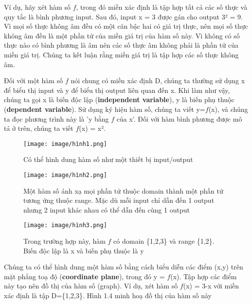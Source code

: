 \documentclass[a4paper,12pt,openany]{book}
\begin{document}
\vspace{13pt}
Ví dụ, hãy xét hàm số $f$, trong đó miền xác định là tập hợp tất cả các số thực và quy tắc là bình phương input. Sau đó, input x = 3 được gán cho output 3² = 9. Vì mọi số thực không âm đều có một căn bậc hai có giá trị thực, nên mọi số thực không âm đều là một phần tử của miền giá trị của hàm số này. Vì không có số thực nào có bình phương là âm nên các số thực âm không phải là phần tử của miền giá trị. Chúng ta kết luận rằng miền giá trị là tập hợp các số thực không âm.
\clearpage
\pagestyle{fancy} %
\fancyhf{} %
\fancyhead[L]{} %

Đối với một hàm số $f$ nói chung có miền xác định D, chúng ta thường sử dụng x để biểu thị input và y để biểu thị output liên quan đến x. Khi làm như vậy, chúng ta gọi x là biến độc lập (\textbf{independent variable}), y là biến phụ thuộc (\textbf{dependent variable}). Sử dụng ký hiệu hàm số, chúng ta viết y=$f$(x), và chúng ta đọc phương trình này là 'y bằng $f$ của x'. Đối với hàm bình phương được mô tả ở trên, chúng ta viết $f$(x) = x².

\begin{figure}[H]
    \centering
    \texttt{[image: image/hình1.png]}
    \caption{Có thể hình dung hàm số như một thiết bị input/output}
    \label{fig:enter-label}
\end{figure}

\begin{figure}[H]
    \centering
    \texttt{[image: image/hình2.png]}
    \caption{Một hàm số ánh xạ mọi phần tử thuộc domain thành một phần tử tương ứng thuộc range. Mặc dù mỗi input chỉ dẫn đến 1 output nhưng 2 input khác nhau có thể dẫn đến cùng 1 output }
    \label{fig:enter-label}
\end{figure}

\begin{figure}[H]
    \centering
    \texttt{[image: image/hình3.png]}
    \caption{Trong trường hợp này, hàm $f$ có domain \{1,2,3\} và range \{1,2\}. Biến độc lập là x và biến phụ thuộc là y}
    \label{fig:enter-label}
\end{figure}

\vspace{5pt}
Chúng ta có thể hình dung một hàm số bằng cách biểu diễn các điểm (x,y) trên mặt phẳng toạ độ (\textbf{coordinate plane}), trong đó y = $f$(x). Tập hợp các điểm này tạo nên đồ thị của hàm số (graph). Ví dụ, xét hàm số $f$(x) = 3-x với miền xác định là tập D=\{1,2,3\}. Hình 1.4 minh hoạ đồ thị của hàm số này
\end{document}
